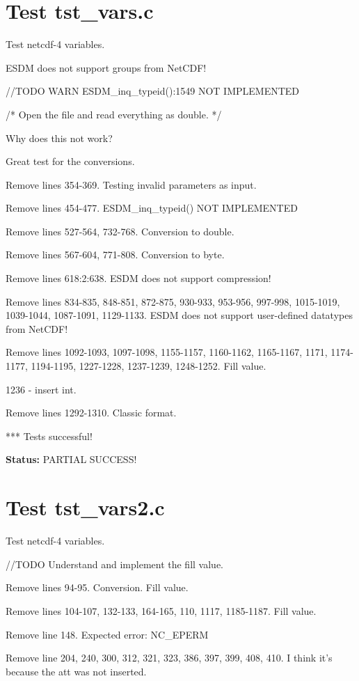 \section{Test tst\_vars.c}

Test netcdf-4 variables.

ESDM does not support groups from NetCDF!

//TODO WARN ESDM\_inq\_typeid():1549 NOT IMPLEMENTED

/* Open the file and read everything as double. */

Why does this not work?

Great test for the conversions.

Remove lines 354-369. Testing invalid parameters as input.

Remove lines 454-477. ESDM\_inq\_typeid() NOT IMPLEMENTED

Remove lines 527-564, 732-768. Conversion to double.

Remove lines 567-604, 771-808. Conversion to byte.

Remove lines 618:2:638. ESDM does not support compression!

Remove lines 834-835, 848-851, 872-875, 930-933, 953-956, 997-998, 1015-1019, 1039-1044, 1087-1091, 1129-1133. ESDM does not support user-defined datatypes from NetCDF!

Remove lines 1092-1093, 1097-1098, 1155-1157, 1160-1162, 1165-1167, 1171, 1174-1177, 1194-1195, 1227-1228, 1237-1239, 1248-1252. Fill value.

1236 - insert int.

Remove lines 1292-1310. Classic format.

*** Tests successful!

{\bf \large Status: } PARTIAL SUCCESS!

\section{Test tst\_vars2.c}

Test netcdf-4 variables.

//TODO Understand and implement the fill value.

Remove lines 94-95. Conversion. Fill value.

Remove lines 104-107, 132-133, 164-165, 110, 1117, 1185-1187. Fill value.

Remove line 148. Expected error: NC\_EPERM

Remove line 204, 240, 300, 312, 321, 323, 386, 397, 399, 408, 410. I think it's because the att was not inserted.

